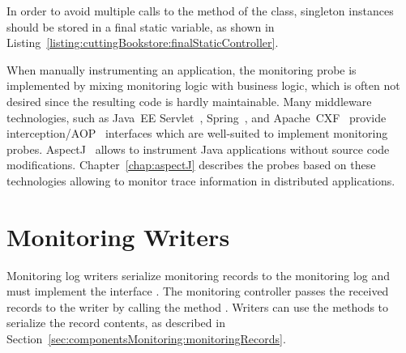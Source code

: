 

\noindent In order to avoid multiple calls to the  method of the %
 class, singleton instances should be stored %
in a final static variable, as shown in Listing~\ref{listing:cuttingBookstore:finalStaticController}.



\noindent When manually instrumenting an application, the monitoring probe is implemented %
by mixing monitoring logic with business logic, which is often not desired since %
the resulting code is hardly maintainable. %
Many middleware technologies, such as Java~EE Servlet~\cite{JavaServletTechnology-WebSite}, %
Spring~\cite{Spring-WebSite}, and %
Apache~CXF~\cite{CXF-WebSite} provide interception/AOP~\cite{Kiczales1997} interfaces %
which are well-suited to implement monitoring probes. AspectJ~\cite{AspectJ-WebSite} allows to %
instrument Java applications without source code modifications. %
Chapter~\ref{chap:aspectJ} describes the \Kieker{} probes based on these technologies allowing to %
monitor trace information in distributed applications. 

\section{Monitoring Writers}\label{sec:monitoring-log-writers}

Monitoring log writers serialize monitoring records to the monitoring log and  %
must implement the interface . The monitoring %
controller passes the received records to the writer by calling the method %
. Writers can use the methods to serialize the %
record contents, as described in Section~\ref{sec:componentsMonitoring:monitoringRecords}. 

